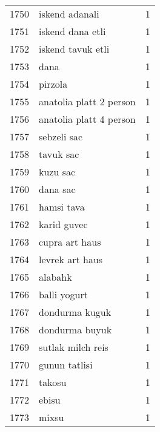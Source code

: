 \begin{tabular}{llr}
1750 &                                     iskend adanali &      1 \\
1751 &                                   iskend dana etli &      1 \\
1752 &                                  iskend tavuk etli &      1 \\
1753 &                                               dana &      1 \\
1754 &                                            pirzola &      1 \\
1755 &                            anatolia platt 2 person &      1 \\
1756 &                            anatolia platt 4 person &      1 \\
1757 &                                        sebzeli sac &      1 \\
1758 &                                          tavuk sac &      1 \\
1759 &                                           kuzu sac &      1 \\
1760 &                                           dana sac &      1 \\
1761 &                                         hamsi tava &      1 \\
1762 &                                        karid guvec &      1 \\
1763 &                                     cupra art haus &      1 \\
1764 &                                    levrek art haus &      1 \\
1765 &                                            alabahk &      1 \\
1766 &                                       balli yogurt &      1 \\
1767 &                                     dondurma kuguk &      1 \\
1768 &                                     dondurma buyuk &      1 \\
1769 &                                  sutlak milch reis &      1 \\
1770 &                                      gunun tatlisi &      1 \\
1771 &                                             takosu &      1 \\
1772 &                                              ebisu &      1 \\
1773 &                                              mixsu &      1 \\

\end{tabular}
